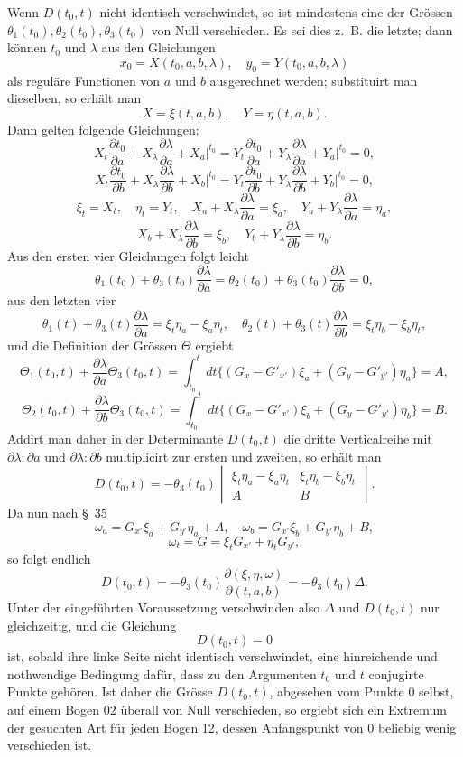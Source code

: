 \documentclass[11pt,a4paper,leqno]{article}
\begin{document}
Wenn $D(t_0,t)$ nicht identisch verschwindet, so ist mindestens eine der Grössen $\theta_1(t_0),\theta_2(t_0),\theta_3(t_0)$ von Null verschieden. Es sei dies z.~B. die letzte; dann können $t_0$ und $\lambda$ aus den Gleichungen
\[
x_0=X(t_0,a,b,\lambda),
\quad y_0=Y(t_0,a,b,\lambda)
\]
als reguläre Functionen von $a$ und $b$ ausgerechnet werden; substituirt man dieselben, so erhält man
\[
X=\xi(t,a,b),
\quad Y=\eta(t,a,b).
\]
Dann gelten folgende Gleichungen:
\[
X_t\frac{\partial t_0}{\partial a}+X_\lambda\frac{\partial\lambda}{\partial a}+X_a\bigg|^{t_0}=Y_t\frac{\partial t_0}{\partial a}+Y_\lambda\frac{\partial\lambda}{\partial a}+Y_a\bigg|^{t_0}=0,
\]
\[
X_t\frac{\partial t_0}{\partial b}+X_\lambda\frac{\partial\lambda}{\partial b}+X_b\bigg|^{t_0}=Y_t\frac{\partial t_0}{\partial b}+Y_\lambda\frac{\partial\lambda}{\partial b}+Y_b\bigg|^{t_0}=0,
\]
\[
\xi_t=X_t,
\quad \eta_t=Y_t,
\quad X_a+X_\lambda\frac{\partial\lambda}{\partial a}=\xi_a,
\quad Y_a+Y_\lambda\frac{\partial\lambda}{\partial a}=\eta_a,
\]
\[
X_b+X_\lambda\frac{\partial\lambda}{\partial b}=\xi_b,
\quad Y_b+Y_\lambda\frac{\partial\lambda}{\partial b}=\eta_b.
\]
Aus den ersten vier Gleichungen folgt leicht
\[
\theta_1(t_0)+\theta_3(t_0)\frac{\partial\lambda}{\partial a}=\theta_2(t_0)+\theta_3(t_0)\frac{\partial\lambda}{\partial b}=0,
\]
aus den letzten vier
\[
\theta_1(t)+\theta_3(t)\frac{\partial\lambda}{\partial a}=\xi_t\eta_a-\xi_a\eta_t,
\quad
\theta_2(t)+\theta_3(t)\frac{\partial\lambda}{\partial b}=\xi_t\eta_b-\xi_b\eta_t,
\]
und die Definition der Grössen $\Theta$ ergiebt
\[
\Theta_1(t_0,t)+\frac{\partial\lambda}{\partial a}\Theta_3(t_0,t)=
\int_{t_0}^{t}dt\{(G_x-G'_{x'})\xi_a+(G_y-G'_{y'})\eta_a\}=A,
\]
\[
\Theta_2(t_0,t)+\frac{\partial\lambda}{\partial b}\Theta_3(t_0,t)=
\int_{t_0}^{t}dt\{(G_x-G'_{x'})\xi_b+(G_y-G'_{y'})\eta_b\}=B.
\]
Addirt man daher in der Determinante $D(t_0,t)$ die dritte Verticalreihe mit $\partial\lambda:\partial a$ und $\partial\lambda:\partial b$ multiplicirt zur ersten und zweiten, so erhält man
\[
D(t_0,t)=-\theta_3(t_0)\begin{vmatrix}
\xi_t\eta_a-\xi_a\eta_t&\xi_t\eta_b-\xi_b\eta_t\\
A&B
\end{vmatrix}.
\]
Da nun nach \S~35
\[
\omega_a=G_{x'}\xi_a+G_{y'}\eta_a+A,
\quad
\omega_b=G_{x'}\xi_b+G_{y'}\eta_b+B,
\]
\[
\omega_t=G=\xi_tG_{x'}+\eta_tG_{y'},
\]
so folgt endlich
\[
D(t_0,t)=-\theta_3(t_0)\frac{\partial(\xi,\eta,\omega)}{\partial(t,a,b)}=-\theta_3(t_0)\Delta.
\]
Unter der eingeführten Voraussetzung verschwinden also $\Delta$ und $D(t_0,t)$ nur gleichzeitig, und die Gleichung
\[
D(t_0,t)=0
\]
ist, sobald ihre linke Seite nicht identisch verschwindet, eine hinreichende und nothwendige Bedingung dafür, dass zu den Argumenten $t_0$ und $t$ conjugirte Punkte gehören. Ist daher die Grösse $D(t_0,t)$, abgesehen vom Punkte 0 selbst, auf einem Bogen 02 überall von Null verschieden, so ergiebt sich ein Extremum
 der gesuchten Art für jeden Bogen 12, dessen Anfangspunkt von 0 beliebig wenig verschieden ist.
\end{document}

